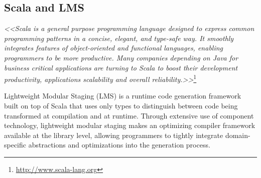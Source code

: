 \subsection{Scala and LMS}
\textit{<<Scala is a general purpose programming language designed to express common programming patterns in a concise, elegant, and type-safe way. It smoothly integrates features of object-oriented and functional languages, enabling programmers to be more productive. Many companies depending on Java for business critical applications are turning to Scala to boost their development productivity, applications scalability and overall reliability.>>}\footnote{\url{http://www.scala-lang.org}}

Lightweight Modular Staging (LMS) is a runtime code generation framework built on top of Scala that uses only types to distinguish between code being transformed at compilation and at runtime. Through extensive use of component technology, lightweight modular staging makes an optimizing compiler framework available at the library level, allowing programmers to tightly integrate domain-specific abstractions and optimizations into the generation process.
